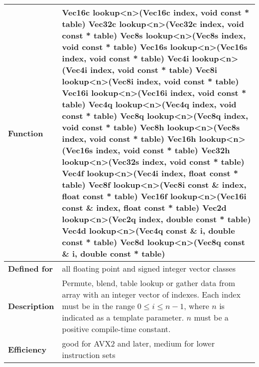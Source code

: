 \documentclass[vcl_manual.tex]{subfiles}
\begin{document}
\begin{tabular}{|p{30mm}|p{120mm}|}
\hline
\bfseries Function &
Vec16c lookup\textless n\textgreater(Vec16c index, void const * table) \newline
Vec32c lookup\textless n\textgreater(Vec32c index, void const * table) \newline
Vec8s lookup\textless n\textgreater(Vec8s index, void const * table) \newline
Vec16s lookup\textless n\textgreater(Vec16s index, void const * table) \newline
Vec4i lookup\textless n\textgreater(Vec4i index, void const * table) \newline
Vec8i lookup\textless n\textgreater(Vec8i index, void const * table) \newline
Vec16i lookup\textless n\textgreater(Vec16i index, void const * table) \newline
Vec4q lookup\textless n\textgreater(Vec4q index, void const * table) \newline
Vec8q lookup\textless n\textgreater(Vec8q index, void const * table) \newline
Vec8h lookup\textless n\textgreater(Vec8s index, void const * table) \newline
Vec16h lookup\textless n\textgreater(Vec16s index, void const * table) \newline
Vec32h lookup\textless n\textgreater(Vec32s index, void const * table) \newline
Vec4f lookup\textless n\textgreater(Vec4i index, float const * table) \newline
Vec8f lookup\textless n\textgreater(Vec8i const \& index, float const * table) \newline
Vec16f lookup\textless n\textgreater(Vec16i const \& index, float const * table) \newline
Vec2d lookup\textless n\textgreater(Vec2q index, double const * table) \newline
Vec4d lookup\textless n\textgreater(Vec4q const \& i, double const * table) \newline
Vec8d lookup\textless n\textgreater(Vec8q const \& i, double const * table) \\ \hline
\bfseries Defined for & all floating point and signed integer vector classes \\ \hline
\bfseries Description & Permute, blend, table lookup or gather data from array with an integer vector of indexes.\newline
Each index must be in the range  $0 \leq i \leq n-1$, where $n$ is indicated as a template parameter. $n$ must be a positive compile-time constant. \\ \hline
\bfseries Efficiency & good for AVX2 and later, medium for lower instruction sets \\ \hline
\end{tabular}
\end{document}
